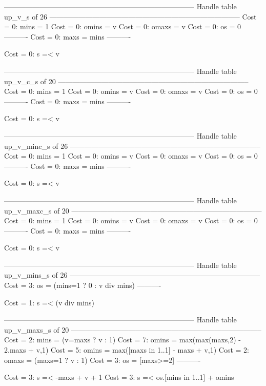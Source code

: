 --------------------------------------------------------------------------------
Handle table up_v_s of 26
--------------------------------------------------------------------------------
Cost =  0:  mins  = 1
Cost =  0:  omins = v
Cost =  0:  omaxs = v
Cost =  0:  os    = 0
----------
Cost =  0:  maxs  = mins
----------

Cost =  0:  s =< v

--------------------------------------------------------------------------------
Handle table up_v_c_s of 20
--------------------------------------------------------------------------------
Cost =  0:  mins  = 1
Cost =  0:  omins = v
Cost =  0:  omaxs = v
Cost =  0:  os    = 0
----------
Cost =  0:  maxs  = mins
----------

Cost =  0:  s =< v

--------------------------------------------------------------------------------
Handle table up_v_minc_s of 26
--------------------------------------------------------------------------------
Cost =  0:  mins  = 1
Cost =  0:  omins = v
Cost =  0:  omaxs = v
Cost =  0:  os    = 0
----------
Cost =  0:  maxs  = mins
----------

Cost =  0:  s =< v

--------------------------------------------------------------------------------
Handle table up_v_maxc_s of 20
--------------------------------------------------------------------------------
Cost =  0:  mins  = 1
Cost =  0:  omins = v
Cost =  0:  omaxs = v
Cost =  0:  os    = 0
----------
Cost =  0:  maxs  = mins
----------

Cost =  0:  s =< v

--------------------------------------------------------------------------------
Handle table up_v_mins_s of 26
--------------------------------------------------------------------------------
Cost =  3:  os = (mins=1 ? 0 : v div mins)
----------

Cost =  1:  s =< (v div mins)

--------------------------------------------------------------------------------
Handle table up_v_maxs_s of 20
--------------------------------------------------------------------------------
Cost =  2:  mins  = (v=maxs ? v : 1)
Cost =  7:  omins = max(max(maxs,2) - 2.maxs + v,1)
Cost =  5:  omins = max([maxs in 1..1] - maxs + v,1)
Cost =  2:  omaxs = (maxs=1 ? v : 1)
Cost =  3:  os    = [maxs>=2]
----------

Cost =  3:  s =< -maxs + v + 1
Cost =  3:  s =< os.[mins in 1..1] + omins

